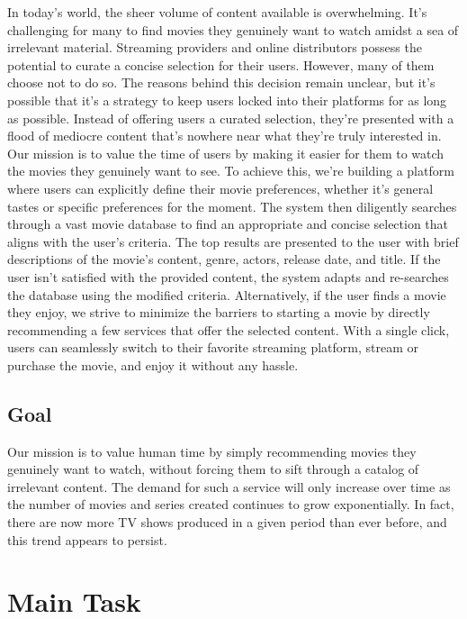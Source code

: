 \documentclass[12pt,a4paper]{article}
\begin{document}
  In today’s world, the sheer volume of content available is overwhelming.
  It’s challenging for many to find movies they genuinely want to watch amidst a sea of irrelevant material.
  Streaming providers and online distributors possess the potential to curate a concise selection for their users.
  However, many of them choose not to do so.
  The reasons behind this decision remain unclear, but it’s possible that it’s a strategy to keep users locked into their platforms for as long as possible.
  Instead of offering users a curated selection, they’re presented with a flood of mediocre content that’s nowhere near what they’re truly interested in.
  Our mission is to value the time of users by making it easier for them to watch the movies they genuinely want to see.
  To achieve this, we’re building a platform where users can explicitly define their movie preferences, whether it’s general tastes or specific preferences for the moment.
  The system then diligently searches through a vast movie database to find an appropriate and concise selection that aligns with the user’s criteria.
  The top results are presented to the user with brief descriptions of the movie’s content, genre, actors, release date, and title.
  If the user isn’t satisfied with the provided content, the system adapts and re-searches the database using the modified criteria.
  Alternatively, if the user finds a movie they enjoy, we strive to minimize the barriers to starting a movie by directly recommending a few services that offer the selected content.
  With a single click, users can seamlessly switch to their favorite streaming platform, stream or purchase the movie, and enjoy it without any hassle.

  \subsection{Goal}
  Our mission is to value human time by simply recommending movies they genuinely want to watch, without forcing them to sift through a catalog of irrelevant content.
  The demand for such a service will only increase over time as the number of movies and series created continues to grow exponentially.
  In fact, there are now more TV shows produced in a given period than ever before, and this trend appears to persist.

  \section{Main Task}
\end{document}
